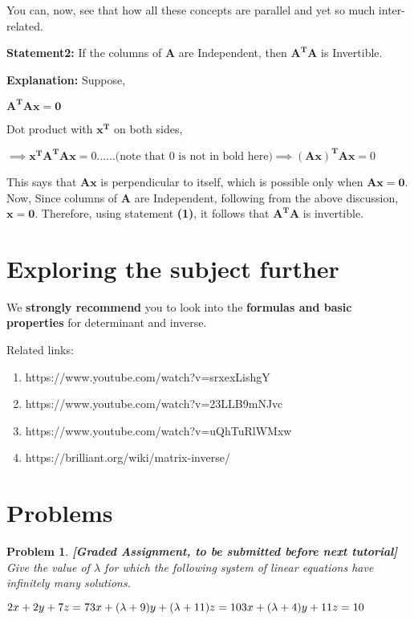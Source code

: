 \documentclass[a4paper]{article}
\newtheorem{problem}{Problem}
\begin{document}
You can, now, see that how all these concepts are parallel and yet so much inter-related. 

\textbf{Statement2: }If the columns of $\mathbf{A}$ are Independent, then $\mathbf{A^{T}A}$ is Invertible.

\textbf{Explanation: }Suppose,
\begin{center}
    $\mathbf{A^TAx} = \mathbf{0}$
\end{center}
Dot product with $\mathbf{x^T}$ on both sides,
\begin{center}
    $
    \implies \mathbf{x^TA^TAx} = 0 \dots\dots \textrm{(note that 0 is not in bold here)}

    \implies \mathbf{(Ax)^TAx} = 0
    $
\end{center}

This says that $\mathbf{Ax}$ is perpendicular to itself, which is possible only when $\mathbf{Ax} = \mathbf{0}$. Now, Since columns of $\mathbf{A}$ are Independent, following from the above discussion, $\mathbf{x} = \mathbf{0}$. Therefore, using statement \textbf{(1)}, it follows that $\mathbf{A^TA}$ is invertible.

\newpage
\section{Exploring the subject further}
We \textbf{strongly recommend} you to look into the \textbf{formulas and basic properties} for determinant and inverse.

Related links:
\begin{enumerate}
    \item https://www.youtube.com/watch?v=srxexLishgY
    \item https://www.youtube.com/watch?v=23LLB9mNJvc
    \item https://www.youtube.com/watch?v=uQhTuRlWMxw
    \item https://brilliant.org/wiki/matrix-inverse/
\end{enumerate}

\section{Problems}
\begin{problem}
    
    \textbf{[Graded Assignment, to be submitted before next tutorial]} Give the value of $\lambda$ for which the following system of linear equations have infinitely many solutions.
    \begin{center}
        $
        2x + 2y + 7z = 7\\
        3x + (\lambda+9)y + (\lambda+11)z = 10 \\
        3x + (\lambda+4)y + 11z = 10
        $
    \end{center}
\end{problem}
\end{document}
